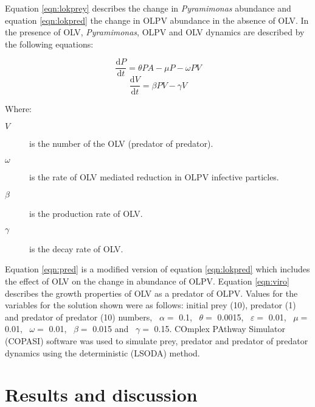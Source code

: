 Equation \ref{eqn:lokprey} describes the change in \emph{Pyramimonas} abundance and equation \ref{eqn:lokpred} the change in \ac{OLPV} abundance in the absence of \ac{OLV}.
In the presence of \ac{OLV}, \emph{Pyramimonas}, \ac{OLPV} and \ac{OLV} dynamics are described by the following equations:

\begin{equation}
\frac{\mathrm{d}P}{\mathrm{d}t}= \theta PA - \mu P - \omega PV
\label{eqn:pred}
\end{equation}
\begin{equation}
\frac{\mathrm{d}V}{\mathrm{d}t}=\beta PV - \gamma V
\label{eqn:viro}
\end{equation}

Where:
\begin{description}
\item[$V$] is the number of the \ac{OLV} (predator of predator).
\item[$\omega$] is the rate of \ac{OLV} mediated reduction in OLPV infective particles.
\item[$\beta$] is the production rate of \ac{OLV}.
\item[$\gamma$] is the decay rate of \ac{OLV}.
\end{description}

Equation \ref{eqn:pred} is a modified version of equation \ref{eqn:lokpred} which includes the effect of \ac{OLV} on the change in abundance of \ac{OLPV}.
Equation \ref{eqn:viro} describes the growth properties of \ac{OLV} as a predator of \ac{OLPV}.
Values for the variables for the solution shown  were as follows: initial prey (10), predator (1) and predator of predator (10) numbers, ~$\alpha=$ 0.1, ~$\theta=$ 0.0015, ~$\varepsilon=$ 0.01, ~$\mu=$ 0.01, ~$\omega=$ 0.01, ~$\beta=$ 0.015 and ~$\gamma=$ 0.15. 
COmplex PAthway Simulator (\textsc{COPASI}) software \cite{Hoops2006} was used to simulate prey, predator and predator of predator dynamics using the deterministic (\textsc{LSODA}) method.


\section{Results and discussion}
\acresetall
